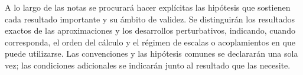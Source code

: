 \documentclass[11pt,a4paper,oneside,openany]{book}
\theoremstyle{plain}
\theoremstyle{definition}
\theoremstyle{remark}
\begin{document}
A lo largo de las notas se procurará hacer explícitas las hipótesis que
sostienen cada resultado importante y su ámbito de validez. Se distinguirán
los resultados exactos de las aproximaciones y los desarrollos
perturbativos, indicando, cuando corresponda, el orden del cálculo y el
régimen de escalas o acoplamientos en que puede utilizarse. Las convenciones
y las hipótesis comunes se declararán una sola vez; las condiciones
adicionales se indicarán junto al resultado que las necesite.
\end{document}
